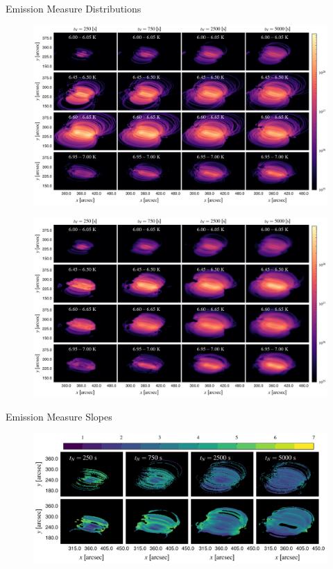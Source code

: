 \documentclass[final]{beamer}
\begin{document}
\begin{frame}
\begin{columns}[T]
\begin{column}{0.49\linewidth}
\begin{block}{Emission Measure Distributions}
\begin{figure}
        \includegraphics[width=\columnwidth]{figures/em_maps_true.pdf}
      \end{figure}
      \begin{figure}
        \includegraphics[width=\columnwidth]{figures/em_maps_predicted.pdf}
      \end{figure}
    \end{block}
    \begin{block}{Emission Measure Slopes}
      \begin{figure}
        \includegraphics[width=\columnwidth]{figures/em_slope_maps.pdf}

\end{figure}
\end{block}
\end{column}
\end{columns}
\end{frame}
\end{document}
